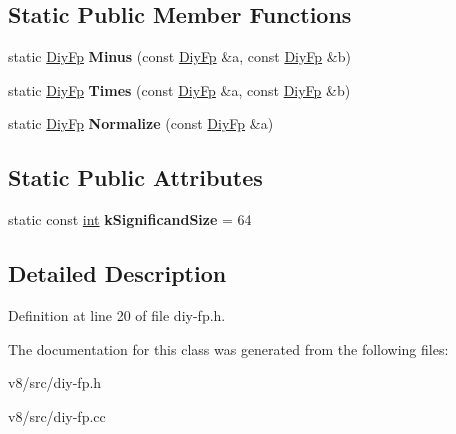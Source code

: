 \subsection*{Static Public Member Functions}
\begin{DoxyCompactItemize}
\item 
\mbox{\label{classv8_1_1internal_1_1DiyFp_a3f8e81ff6c13ae8b5935a0ec5acfcf2f}} 
static \mbox{\hyperlink{classv8_1_1internal_1_1DiyFp}{Diy\+Fp}} {\bfseries Minus} (const \mbox{\hyperlink{classv8_1_1internal_1_1DiyFp}{Diy\+Fp}} \&a, const \mbox{\hyperlink{classv8_1_1internal_1_1DiyFp}{Diy\+Fp}} \&b)
\item 
\mbox{\label{classv8_1_1internal_1_1DiyFp_a92c31f86fc66d3f38b210dd116bc444a}} 
static \mbox{\hyperlink{classv8_1_1internal_1_1DiyFp}{Diy\+Fp}} {\bfseries Times} (const \mbox{\hyperlink{classv8_1_1internal_1_1DiyFp}{Diy\+Fp}} \&a, const \mbox{\hyperlink{classv8_1_1internal_1_1DiyFp}{Diy\+Fp}} \&b)
\item 
\mbox{\label{classv8_1_1internal_1_1DiyFp_a379331248231f685a0c4c039f4bd4173}} 
static \mbox{\hyperlink{classv8_1_1internal_1_1DiyFp}{Diy\+Fp}} {\bfseries Normalize} (const \mbox{\hyperlink{classv8_1_1internal_1_1DiyFp}{Diy\+Fp}} \&a)
\end{DoxyCompactItemize}
\subsection*{Static Public Attributes}
\begin{DoxyCompactItemize}
\item 
\mbox{\label{classv8_1_1internal_1_1DiyFp_a751e7d05584e45570106af4828453393}} 
static const \mbox{\hyperlink{classint}{int}} {\bfseries k\+Significand\+Size} = 64
\end{DoxyCompactItemize}


\subsection{Detailed Description}


Definition at line 20 of file diy-\/fp.\+h.



The documentation for this class was generated from the following files\+:\begin{DoxyCompactItemize}
\item 
v8/src/diy-\/fp.\+h\item 
v8/src/diy-\/fp.\+cc\end{DoxyCompactItemize}
